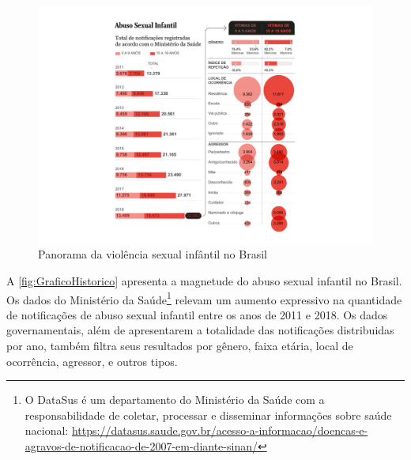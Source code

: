
\begin{figure}[htb]
	\caption{\label{fig:GraficoHistorico}Panorama da violência sexual infântil no Brasil}
    \hspace{-5.0 cm}
    \includegraphics[width=1.6\linewidth]{./Figuras/GraficoHistorico.pdf}
\end{figure}


A \autoref{fig:GraficoHistorico} apresenta a magnetude do abuso sexual infantil no Brasil. Os dados do Ministério da Saúde\footnote{O DataSus é um departamento do Ministério da Saúde com a responsabilidade de coletar, processar e disseminar informações sobre saúde nacional: \url{https://datasus.saude.gov.br/acesso-a-informacao/doencas-e-agravos-de-notificacao-de-2007-em-diante-sinan/}} relevam um aumento expressivo na quantidade de notificações de abuso sexual infantil entre os anos de 2011 e 2018. Os dados governamentais, além de apresentarem a totalidade das notificações distribuidas por ano, também filtra seus resultados por gênero, faixa etária, local de ocorrência, agressor, e outros tipos. 

